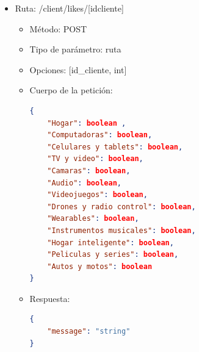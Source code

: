 \begin{itemize}
\item Ruta: /client/likes/[idcliente]
\begin{itemize}
\item Método: POST
\item Tipo de parámetro: ruta
\item Opciones: [id\_cliente, int]
\item Cuerpo de la petición:
\begin{lstlisting}[language=json,firstnumber=1]
{
	"Hogar": boolean ,
	"Computadoras": boolean,
	"Celulares y tablets": boolean,
	"TV y video": boolean,
	"Camaras": boolean,
	"Audio": boolean,
	"Videojuegos": boolean, 
	"Drones y radio control": boolean,
	"Wearables": boolean,
	"Instrumentos musicales": boolean,
	"Hogar inteligente": boolean,
	"Peliculas y series": boolean,
	"Autos y motos": boolean
}
\end{lstlisting}
\item Respuesta: 
\begin{lstlisting}[language=json,firstnumber=1]
{
    "message": "string"
}
\end{lstlisting}
\end{itemize}
\end{itemize}

